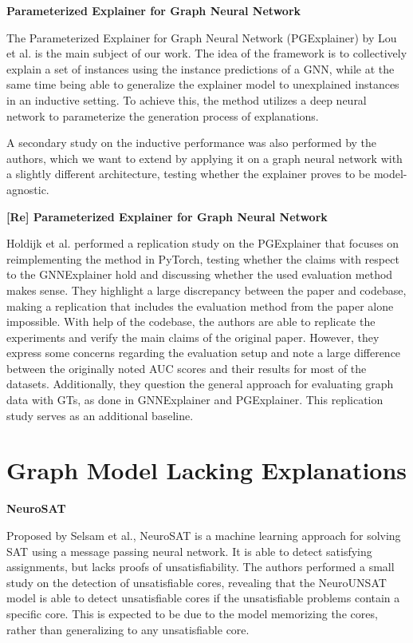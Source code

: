\textbf{Parameterized Explainer for Graph Neural Network} \par
The Parameterized Explainer for Graph Neural Network (PGExplainer) by Lou et al. \cite{luo2020parameterized} is the main subject of our work. The idea of the framework is to collectively explain a set of instances using the instance predictions of a GNN, while at the same time being able to generalize the explainer model to unexplained instances in an inductive setting. To achieve this, the method utilizes a deep neural network to parameterize the generation process of explanations.

A secondary study on the inductive performance was also performed by the authors, which we want to extend by applying it on a graph neural network with a slightly different architecture, testing whether the explainer proves to be model-agnostic. \bigskip

\textbf{[Re] Parameterized Explainer for Graph Neural Network} \par
Holdijk et al. \cite{holdijk2021re} performed a replication study on the PGExplainer that focuses on reimplementing the method in PyTorch, testing whether the claims with respect to the GNNExplainer hold and discussing whether the used evaluation method makes sense. They highlight a large discrepancy between the paper and codebase, making a replication that includes the evaluation method from the paper alone impossible. With help of the codebase, the authors are able to replicate the experiments and verify the main claims of the original paper. However, they express some concerns regarding the evaluation setup and note a large difference between the originally noted AUC scores and their results for most of the datasets. Additionally, they question the general approach for evaluating graph data with \acp{GT}, as done in GNNExplainer and PGExplainer. This replication study serves as an additional baseline.

\section{Graph Model Lacking Explanations}
\label{sec:Downstream_Models}

\textbf{NeuroSAT}\par
Proposed by Selsam et al., NeuroSAT \cite{selsam2018learning} is a machine learning approach for solving SAT using a message passing neural network. It is able to detect satisfying assignments, but lacks proofs of unsatisfiability. The authors performed a small study on the detection of unsatisfiable cores, revealing that the NeuroUNSAT model is able to detect unsatisfiable cores if the unsatisfiable problems contain a specific core. This is expected to be due to the model memorizing the cores, rather than generalizing to any unsatisfiable core. 
